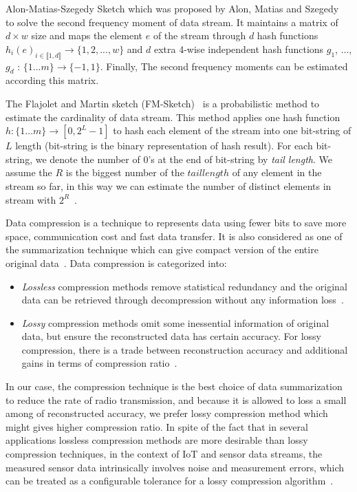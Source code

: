 Alon-Matias-Szegedy Sketch which was proposed by Alon, Matias and
Szegedy~\cite{alon1999space} to solve the second frequency moment of data
stream. It maintains a matrix of $d\times{w}$ size and maps the element $e$ of
the stream through $d$ hash functions $h_{i}(e)_{i\in \llbracket 1, d
\rrbracket} \rightarrow \{1, 2, ..., w\}$ and $d$ extra 4-wise independent hash
functions $g_1$, ..., $g_d$ : $\{1...m\}\rightarrow \{-1, 1\}$. Finally, The
second frequency moments can be estimated according this matrix.

The Flajolet and Martin sketch (FM-Sketch)~\cite{flajolet1985probabilistic} is a
probabilistic method to estimate the cardinality of data stream. This method
applies one hash function $h: \{1...m\}\rightarrow [0,2^{L}-1]$ to hash each
element of the stream into one bit-string of $L$ length (bit-string is the
binary representation of hash result). For each bit-string, we denote the number
of 0's at the end of bit-string by \emph{tail length}. We assume the $R$ is the
biggest number of the $tail length$ of any element in the stream so far, in this
way we can estimate the number of distinct elements in stream with
$2^R$~\cite{flajolet1985probabilistic, garofalakis2016data}.


Data compression is a technique to represents data using fewer bits to save more
space, communication cost and fast data transfer. It is also considered as one
of the summarization technique which can give compact version of the entire
original data~\cite{hesabi2015data}. Data compression is categorized into:
\begin{itemize}
    \item \emph{Lossless} compression methods remove statistical redundancy and
    the original data can be retrieved through decompression without any
    information loss~\cite{hesabi2015data}.
    \item \emph{Lossy} compression methods omit some inessential information of
    original data, but ensure the reconstructed data has certain accuracy. For
    lossy compression, there is a trade between reconstruction accuracy and
    additional gains in terms of compression ratio~\cite{zordan2014performance}.
\end{itemize}

In our case, the compression technique is the best choice of data summarization
to reduce the rate of radio transmission, and because it is allowed to loss a
small among of reconstructed accuracy, we prefer lossy compression method which
might gives higher compression ratio. In spite of the fact that in several
applications lossless compression methods are more desirable than lossy
compression techniques, in the context of IoT and sensor data streams, the
measured sensor data intrinsically involves noise and measurement errors, which
can be treated as a configurable tolerance for a lossy compression
algorithm~\cite{li2018multi}.

